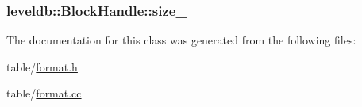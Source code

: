 \subsubsection[{size\+\_\+}]{ leveldb\+::\+Block\+Handle\+::size\+\_\+\hspace{0.3cm}{\ttfamily [private]}}\label{classleveldb_1_1_block_handle_a2cbf22e0eb41dbc60d2b4396b85cde7e}


The documentation for this class was generated from the following files\+:\begin{DoxyCompactItemize}
\item 
table/\hyperlink{format_8h}{format.\+h}\item 
table/\hyperlink{format_8cc}{format.\+cc}\end{DoxyCompactItemize}
